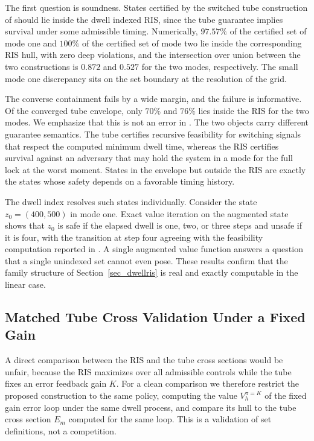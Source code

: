 \documentclass[journal]{IEEEtran}
\begin{document}
The first question is soundness. States certified by the switched tube construction of \cite{zhang2016} should lie inside the dwell indexed RIS, since the tube guarantee implies survival under some admissible timing. Numerically, $97.57\%$ of the certified set of mode one and $100\%$ of the certified set of mode two lie inside the corresponding RIS hull, with zero deep violations, and the intersection over union between the two constructions is $0.872$ and $0.527$ for the two modes, respectively. The small mode one discrepancy sits on the set boundary at the resolution of the grid.

The converse containment fails by a wide margin, and the failure is informative. Of the converged tube envelope, only $70\%$ and $76\%$ lies inside the RIS for the two modes. We emphasize that this is not an error in \cite{zhang2016}. The two objects carry different guarantee semantics. The tube certifies recursive feasibility for switching signals that respect the computed minimum dwell time, whereas the RIS certifies survival against an adversary that may hold the system in a mode for the full lock at the worst moment. States in the envelope but outside the RIS are exactly the states whose safety depends on a favorable timing history.

The dwell index resolves such states individually. Consider the state $z_0 = (400, 500)$ in mode one. Exact value iteration on the augmented state shows that $z_0$ is safe if the elapsed dwell is one, two, or three steps and unsafe if it is four, with the transition at step four agreeing with the feasibility computation reported in \cite{zhang2016}. A single augmented value function answers a question that a single unindexed set cannot even pose. These results confirm that the family structure of Section~\ref{sec_dwellris} is real and exactly computable in the linear case.

\subsection{Matched Tube Cross Validation Under a Fixed Gain}

A direct comparison between the RIS and the tube cross sections would be unfair, because the RIS maximizes over all admissible controls while the tube fixes an error feedback gain $K$. For a clean comparison we therefore restrict the proposed construction to the same policy, computing the value $V_h^{\pi = K}$ of the fixed gain error loop under the same dwell process, and compare its hull to the tube cross section $E_m$ computed for the same loop. This is a validation of set definitions, not a competition.
\end{document}
